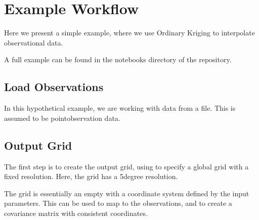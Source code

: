 \documentclass[letterpaper,10pt,english]{sphinxmanual}
\begin{document}
\sphinxstepscope


\chapter{Example Workflow}
\label{\detokenize{workflow:example-workflow}}\label{\detokenize{workflow::doc}}
\sphinxAtStartPar
Here we present a simple example, where we use Ordinary Kriging to interpolate observational data.

\sphinxAtStartPar
A full example can be found in the notebooks directory of the repository.


\section{Load Observations}
\label{\detokenize{workflow:load-observations}}
\sphinxAtStartPar
In this hypothetical example, we are working with data from a  file. This is assumed to be
point\sphinxhyphen{}observation data.

\begin{sphinxVerbatim}[commandchars=\\\{\}]
   
\end{sphinxVerbatim}


\section{Output Grid}
\label{\detokenize{workflow:output-grid}}
\sphinxAtStartPar
The first step is to create the output grid, using
{\hyperref[\detokenize{covariance:glomar_gridding.grid.grid_from_resolution}]{}} to specify a global grid with a fixed
resolution. Here, the grid has a 5\sphinxhyphen{}degree resolution.

\sphinxAtStartPar
The grid is essentially an empty  with a coordinate system defined by the input
parameters. This can be used to map to the observations, and to create a covariance matrix with
consistent coordinates.

\begin{sphinxVerbatim}[commandchars=\\\{\}]
  
    \PYG{p}{[}   \PYG{p}{]}
    \PYG{p}{[} \PYG{p}{]}
\end{sphinxVerbatim}
\end{document}
